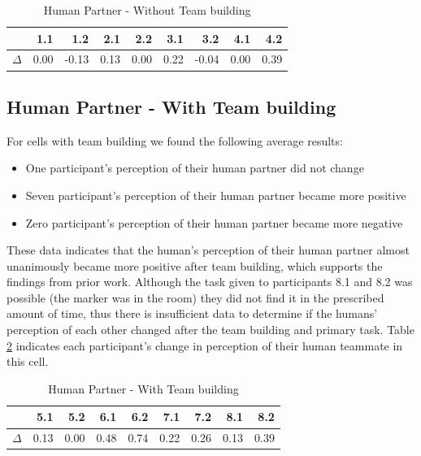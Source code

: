 \documentclass{acm_proc_article-sp}
\begin{document}
\begin{table}
\centering
\caption{Human Partner - Without Team building}
\begin{tabular}{|r|r|r|r|r|r|r|r|r|} \hline
&1.1&1.2&2.1&2.2&3.1&3.2&4.1&4.2\\ \hline
$\Delta$&0.00&-0.13&0.13&0.00&0.22&-0.04&0.00&0.39 \\ \hline
\end{tabular}
\label{table:HNT}
\end{table}

\subsection{Human Partner - With Team building}
For cells with team building we found the following average results:
\begin{itemize}
 \item One participant's perception of their human partner did not change
 \item Seven participant's perception of their human partner became more positive
 \item Zero participant's perception of their human partner became more negative
\end{itemize}
These data indicates that the human's perception of their human partner almost unanimously became more positive after team building, which supports the findings from prior work. Although the task given to participants 8.1 and 8.2 was possible (the marker was in the room) they did not find it in the prescribed amount of time, thus there is insufficient data to determine if the humans' perception of each other changed after the team building and primary task. Table \ref{table:HT} indicates each participant's change in perception of their human teammate in this cell.

\begin{table}
\centering
\caption{Human Partner - With Team building}
\begin{tabular}{|r|r|r|r|r|r|r|r|r|} \hline
&5.1&5.2&6.1&6.2&7.1&7.2&8.1&8.2 \\ \hline
$\Delta$&0.13&0.00&0.48&0.74&0.22&0.26&0.13&0.39 \\ \hline
\end{tabular}
\label{table:HT}
\end{table}
\end{document}

